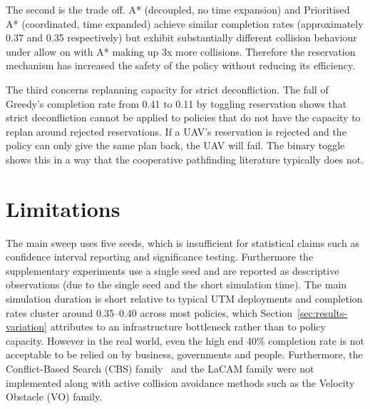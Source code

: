 \vspace{1em}

The second is the trade off. A* (decoupled, no time expansion) and Prioritised A* (coordinated, time expanded) achieve similar completion rates (approximately 0.37 and 0.35 respectively) but exhibit substantially different collision behaviour under allow on with A* making up 3x more collisions. Therefore the reservation mechanism has increased the safety of the policy without reducing its efficiency. \par

\vspace{1em}

The third concerns replanning capacity for strict deconfliction. The fall of Greedy's completion rate from 0.41 to 0.11 by toggling reservation shows that strict deconfliction cannot be applied to policies that do not have the capacity to replan around rejected reservations. If a UAV's reservation is rejected and the policy can only give the same plan back, the UAV will fail. The binary toggle shows this in a way that the cooperative pathfinding literature typically does not.\par

\vspace{1em}

\section{Limitations}
\label{sec:results-limitations}

The main sweep uses five seeds, which is insufficient for statistical claims such as confidence interval reporting and significance testing. Furthermore the supplementary experiments use a single seed and are reported as descriptive observations (due to the single seed and the short simulation time). The main simulation duration is short relative to typical UTM deployments and completion rates cluster around 0.35--0.40 across most policies, which Section~\ref{sec:results-variation} attributes to an infrastructure bottleneck rather than to policy capacity. However in the real world, even the high end 40\% completion rate is not acceptable to be relied on by business, governments and people. Furthermore, the Conflict-Based Search (CBS) family~\cite{sharon2015cbs} and the LaCAM family were not implemented along with active collision avoidance methods such as the Velocity Obstacle (VO) family.\par

\vspace{1em}


